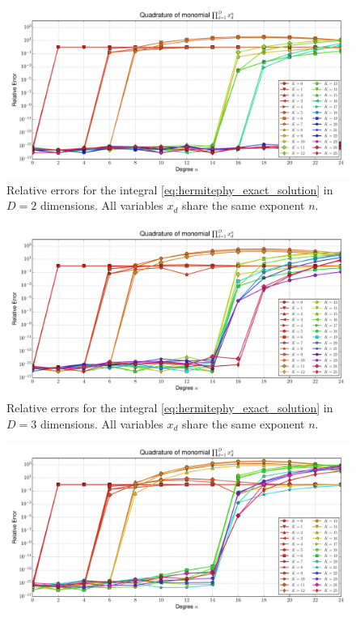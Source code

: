 \documentclass[a4paper,10pt]{article}
\begin{document}
\begin{subfigures}
  \label{fig:monomial_errors_hermitephy_multivariate}
  \begin{figure}\centering
    \includegraphics[width=\linewidth]{./img/monomial_errors_hermitephy_multivariate_dimension_2.pdf}
    \caption{Relative errors for the integral \eqref{eq:hermitephy_exact_solution}
    in $D=2$ dimensions. All variables $x_d$ share the same exponent $n$.}
    \label{fig:monomial_errors_hermitephy_multivariate_dimension_2}
  \end{figure}
  \begin{figure}\centering
    \includegraphics[width=\linewidth]{./img/monomial_errors_hermitephy_multivariate_dimension_3.pdf}
    \caption{Relative errors for the integral \eqref{eq:hermitephy_exact_solution}
    in $D=3$ dimensions. All variables $x_d$ share the same exponent $n$.}
    \label{fig:monomial_errors_hermitephy_multivariate_dimension_3}
  \end{figure}
  \begin{figure}\centering
    \includegraphics[width=\linewidth]{./img/monomial_errors_hermitephy_multivariate_dimension_4.pdf}

\end{figure}
\end{subfigures}
\end{document}
